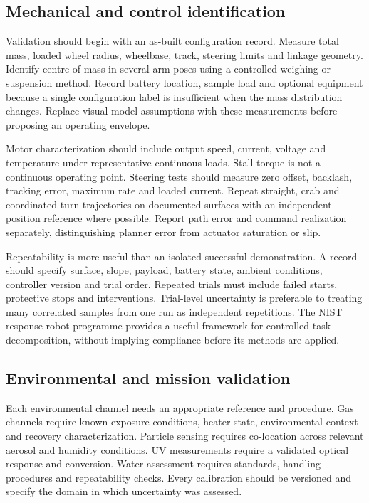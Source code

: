 \documentclass[11pt,a4paper]{article}
\begin{document}
\endgroup

\FloatBarrier

\subsection{Mechanical and control identification}\label{sec:11.2}

Validation should begin with an as-built configuration record. Measure total mass, loaded wheel radius, wheelbase, track, steering limits and linkage geometry. Identify centre of mass in several arm poses using a controlled weighing or suspension method. Record battery location, sample load and optional equipment because a single configuration label is insufficient when the mass distribution changes. Replace visual-model assumptions with these measurements before proposing an operating envelope.

Motor characterization should include output speed, current, voltage and temperature under representative continuous loads. Stall torque is not a continuous operating point. Steering tests should measure zero offset, backlash, tracking error, maximum rate and loaded current. Repeat straight, crab and coordinated-turn trajectories on documented surfaces with an independent position reference where possible. Report path error and command realization separately, distinguishing planner error from actuator saturation or slip.

Repeatability is more useful than an isolated successful demonstration. A record should specify surface, slope, payload, battery state, ambient conditions, controller version and trial order. Repeated trials must include failed starts, protective stops and interventions. Trial-level uncertainty is preferable to treating many correlated samples from one run as independent repetitions. The NIST response-robot programme provides a useful framework for controlled task decomposition, without implying compliance before its methods are applied.

\FloatBarrier

\subsection{Environmental and mission validation}\label{sec:11.3}

Each environmental channel needs an appropriate reference and procedure. Gas channels require known exposure conditions, heater state, environmental context and recovery characterization. Particle sensing requires co-location across relevant aerosol and humidity conditions. UV measurements require a validated optical response and conversion. Water assessment requires standards, handling procedures and repeatability checks. Every calibration should be versioned and specify the domain in which uncertainty was assessed.
\end{document}
